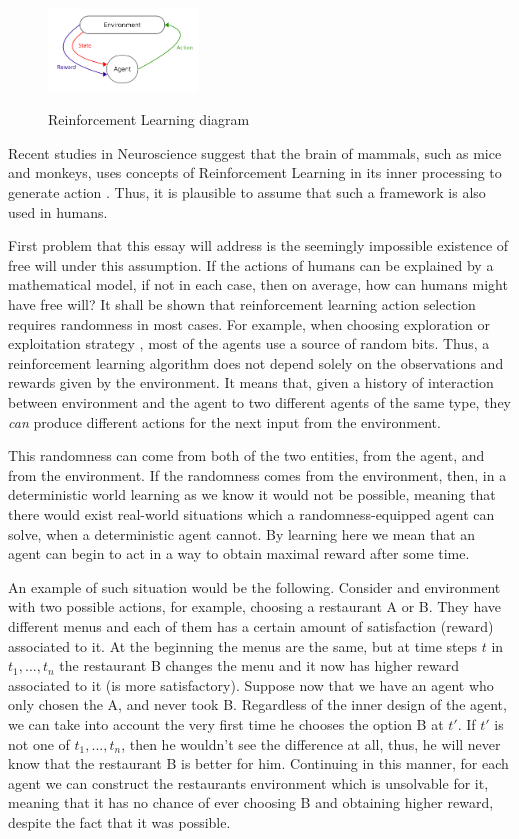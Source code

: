 \documentclass[a4paper]{article}
\begin{document}
\begin{figure}[h]
	\caption{Reinforcement Learning diagram}
	\centering \includegraphics[width=150px]{RL.png}
	\label{RL}
\end{figure}

Recent studies in Neuroscience suggest that the brain of mammals, such as mice and monkeys, uses concepts of Reinforcement Learning in its inner processing to generate action \cite{doyareward, doya2}. Thus, it is plausible to assume that such a framework is also used in humans.

First problem that this essay will address is the seemingly impossible existence of free will under this assumption. If the actions of humans can be explained by a mathematical model, if not in each case, then on average, how can humans might have free will? It shall be shown that reinforcement learning action selection requires randomness in most cases. For example, when choosing exploration or exploitation strategy \cite{sutton}, most of the agents use a source of random bits. Thus, a reinforcement learning algorithm does not depend solely on the observations and rewards given by the environment. It means that, given a history of interaction between environment and the agent to two different agents of the same type, they {\em can} produce different actions for the next input from the environment.

This randomness can come from both of the two entities, from the agent, and from the environment. If the randomness comes from the environment, then, in a deterministic world learning as we know it would not be possible, meaning that there would exist real-world situations which a randomness-equipped agent can solve, when a deterministic agent cannot. By learning here we mean that an agent can begin to act in a way to obtain maximal reward after some time.

An example of such situation would be the following. Consider and environment with two possible actions, for example, choosing a restaurant A or B. They have different menus and each of them has a certain amount of satisfaction (reward) associated to it. At the beginning the menus are the same, but at time steps $t$ in $t_1,...,t_n$ the restaurant B changes the menu and it now has higher reward associated to it (is more satisfactory). Suppose now that we have an agent who only chosen the A, and never took B. Regardless of the inner design of the agent, we can take into account the very first time he chooses the option B at $t'$. If $t'$ is not one of $t_1,...,t_n$, then he wouldn't see the difference at all, thus, he will never know that the restaurant B is better for him. Continuing in this manner, for each agent we can construct the restaurants environment which is unsolvable for it, meaning that it has no chance of ever choosing B and obtaining higher reward, despite the fact that it was possible.
\end{document}

